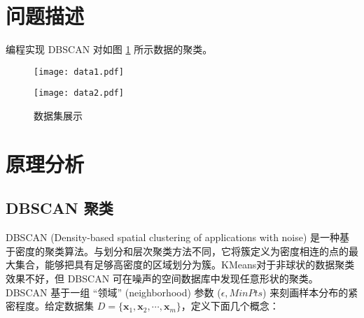 \documentclass[12pt,AutoFakeBold]{article}
\begin{document}
\maketitle
\setcounter{tocdepth}{2}

\tableofcontents  %

\makeatletter
\begin{center}
    \LARGE \textbf{\textsf{\@problem}}
\end{center}
\makeatother


\section{问题描述}

编程实现 DBSCAN 对如图 \ref{fig:dataSet} 所示数据的聚类。

\begin{figure}[htbp]
	\centering
	\begin{minipage}[t]{0.48\textwidth}
		\centering
		\texttt{[image: data1.pdf]}
	\end{minipage}
	\begin{minipage}[t]{0.48\textwidth}
		\centering
		\texttt{[image: data2.pdf]}
	\end{minipage}
	\caption{数据集展示} \label{fig:dataSet}
\end{figure}

\section{原理分析}

\subsection{DBSCAN 聚类}

DBSCAN (Density-based spatial clustering of applications with noise) 是一种基于密度的聚类算法。与划分和层次聚类方法不同，它将簇定义为密度相连的点的最大集合，能够把具有足够高密度的区域划分为簇。KMeans对于非球状的数据聚类效果不好，但 DBSCAN 可在噪声的空间数据库中发现任意形状的聚类。DBSCAN 基于一组 “领域” (neighborhood) 参数 ($\epsilon, MinPts$) 来刻画样本分布的紧密程度。给定数据集 $D=\{\bm{x}_1,\bm{x}_2,\cdots,\bm{x}_m\}$，定义下面几个概念：
\end{document}
